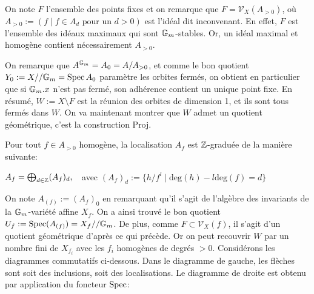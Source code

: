 On note $F$ l'ensemble des points fixes et on remarque que $F=\mathcal{V}_X(A_{>0})$, où $A_{>0}:=(f\mid f\in A_d \textrm{ pour un }d>0)$ est l'idéal dit inconvenant. En effet, $F$ est l'ensemble des idéaux maximaux qui sont $\mathbb{G}_m$-stables. Or, un idéal maximal et homogène contient nécessairement $A_{>0}$.

On remarque que $A^{\mathbb{G}_m}=A_0=A/A_{>0}$, et comme le bon quotient $Y_0:=X//\mathbb{G}_m=\operatorname{Spec} A_0$ paramètre les orbites fermés, on obtient en particulier que si $\mathbb{G}_m.x$ n'est pas fermé, son adhérence contient un unique point fixe. En résumé, $W:=X\setminus F$ est la réunion des orbites de dimension 1, et ils sont tous fermés dans $W$. On va maintenant montrer que $W$ admet un quotient géométrique, c'est la construction Proj.

Pour tout $f\in A_{>0}$ homogène, la localisation $A_f$ est $\mathbb{Z}$-graduée de la manière suivante:
\begin{center}
$A_f=\bigoplus_{d\in \mathbb{Z}}(A_f)_d,\,\,\,\, $ avec $(A_f)_d:=\lbrace h/f^l\mid \textrm{deg}(h)-l\textrm{deg}(f)=d \rbrace$
\end{center}
On note $A_{(f)}:=(A_f)_0$ en remarquant qu'il s'agit de l'algèbre des invariants de la $\mathbb{G}_m$-variété affine $X_f$. On a ainsi trouvé le bon quotient $U_f:=\operatorname{Spec}(A_{(f)})=X_f//\mathbb{G}_m$. De plus, comme $F\subset\mathcal{V}_X(f)$,  il s'agit d'un quotient géométrique d'après ce qui précède. Or on peut recouvrir $W$ par un nombre fini de $X_{f_i}$ avec les $f_i$ homogènes de degrés $>0$. Considérons les diagrammes commutatifs ci-dessous. Dans le diagramme de gauche, les flèches sont soit des inclusions, soit des localisations. Le diagramme de droite est obtenu par application du foncteur $\operatorname{Spec}$:
\begin{multicols}{2}
	\begin{center}
	\\
	\end{center}
	
	\columnbreak
	\begin{center}
	\\
	\end{center}
\end{multicols}
